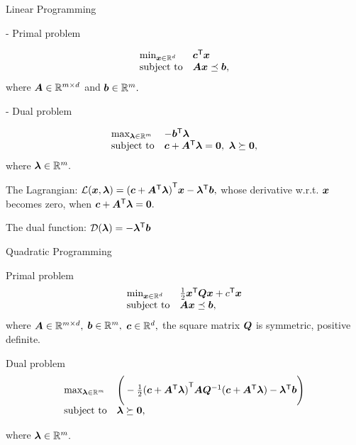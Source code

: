 \documentclass[handout,fleqn,aspectratio=169]{beamer}
\begin{document}
\begin{frame}{Linear Programming}

{
- Primal problem

$$
\begin{array}{ll}
\mbox{min}_{\bm{x} \in {\mathbb R}^d} & {\bm{c}}^{\mathsf{T}}\bm{x} \\
\mbox{subject to} & \bm{A} \bm{x} \preceq \bm{b},  
\end{array}
$$
where $\bm{A} \in {\mathbb R}^{m \times d}$ and $\bm{b} \in {\mathbb R}^{m}.$
}
{
- Dual problem

$$
\displaystyle
\begin{array}{ll}
\text{max}_{\bm{\lambda} \in {\mathbb R}^m} & -{\bm{b}}^{\mathsf{T}}\bm{\lambda} \\
\mbox{subject to} & \bm{c} + {\bm{A}}^{\mathsf{T}}\bm{\lambda} = \bm{0}, \ \bm{\lambda} \succeq \bm{0},
\end{array}
$$
where $\bm{\lambda} \in {\mathbb R}^{m}.$
}

\plitemsep 0.1in
\bci 

\item The Lagrangian: ${\cal L}(\bm{x}, \bm{\lambda}) = {(\bm{c} + {\bm{A}}^{\mathsf{T}}\bm{\lambda})}^{\mathsf{T}}\bm{x} - {\bm{\lambda}}^{\mathsf{T}} \bm{b},$ 
whose derivative w.r.t. $\bm{x}$ becomes zero, when $\bm{c} + {\bm{A}}^{\mathsf{T}}\bm{\lambda} = \bm{0}.$

\item The dual function: ${\cal D}(\bm{\lambda}) = -{\bm{\lambda}}^{\mathsf{T}} \bm{b}$
\eci

\end{frame}

\begin{frame}{Quadratic Programming}

\plitemsep 0.1in
\bci 

\item Primal problem
$$
\begin{array}{ll}
\mbox{min}_{\bm{x} \in {\mathbb R}^d} & \frac{1}{2} {\bm{x}}^{\mathsf{T}}\bm{Q} \bm{x} + {c}^{\mathsf{T}}\bm{x} \\
\mbox{subject to} & \bm{A} \bm{x} \preceq \bm{b},  
\end{array}
$$
where $\bm{A} \in {\mathbb R}^{m \times d},$ $\bm{b} \in {\mathbb R}^{m},$ $\bm{c} \in {\mathbb R}^d,$ the square matrix $\bm{Q}$ is symmetric, positive definite. 

\item Dual problem
$$
\begin{array}{ll}
\text{max}_{\bm{\lambda} \in {\mathbb R}^m} & \Bigg(-\frac{1}{2}{(\bm{c} + {\bm{A}}^{\mathsf{T}}\bm{\lambda})}^{\mathsf{T}}\bm{A}{{\bm{Q}}^{-1}}(\bm{c} + {\bm{A}}^{\mathsf{T}}\bm{\lambda}) -{\bm{\lambda}}^{\mathsf{T}}\bm{b} \Bigg )\\
\text{subject to} & \bm{\lambda} \succeq \bm{0},
\end{array}
$$

where $\bm{\lambda} \in {\mathbb R}^{m}.$

\eci

\end{frame}
\end{document}
